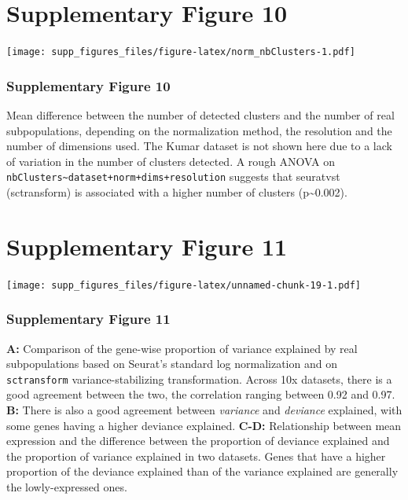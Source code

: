 \documentclass[]{article}
\begin{document}
\hypertarget{supplementary-figure-10}{%
\section{Supplementary Figure 10}\label{supplementary-figure-10}}

\texttt{[image: supp\_figures\_files/figure-latex/norm\_nbClusters-1.pdf]}

\hypertarget{supplementary-figure-10-1}{%
\subsubsection{Supplementary Figure
10}\label{supplementary-figure-10-1}}

Mean difference between the number of detected clusters and the number
of real subpopulations, depending on the normalization method, the
resolution and the number of dimensions used. The Kumar dataset is not
shown here due to a lack of variation in the number of clusters
detected. A rough ANOVA on
\texttt{nbClusters\textasciitilde{}dataset+norm+dims+resolution}
suggests that seuratvst (sctransform) is associated with a higher number
of clusters (p\textasciitilde{}0.002).

\hypertarget{supplementary-figure-11}{%
\section{Supplementary Figure 11}\label{supplementary-figure-11}}

\texttt{[image: supp\_figures\_files/figure-latex/unnamed-chunk-19-1.pdf]}

\hypertarget{supplementary-figure-11-1}{%
\subsubsection{Supplementary Figure
11}\label{supplementary-figure-11-1}}

\textbf{A:} Comparison of the gene-wise proportion of variance explained
by real subpopulations based on Seurat's standard log normalization and
on \texttt{sctransform} variance-stabilizing transformation. Across 10x
datasets, there is a good agreement between the two, the correlation
ranging between 0.92 and 0.97. \textbf{B:} There is also a good
agreement between \emph{variance} and \emph{deviance} explained, with
some genes having a higher deviance explained. \textbf{C-D:}
Relationship between mean expression and the difference between the
proportion of deviance explained and the proportion of variance
explained in two datasets. Genes that have a higher proportion of the
deviance explained than of the variance explained are generally the
lowly-expressed ones.
\end{document}
